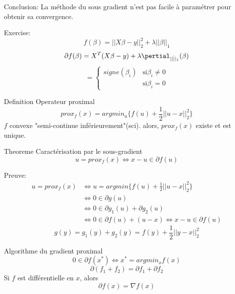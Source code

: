 \documentclass{article}
\begin{document}
Conclusion: La m\'ethode du sous gradient n'est pas facile \`a param\'etrer pour obtenir sa convergence.

Exercise: 
\begin{equation}
f(\beta)=||X\beta-y||_2^2+\lambda||\beta||_1
\end{equation}
\begin{equation}
\partial f(\beta)=X^T(X\beta-y)+\lambda\pertial_{||\dot||_1}(\beta)
\end{equation}
\begin{equation}
[\partial_{||\dot||_1}(\beta)]=\left\{\begin{array}{rcl}
signe(\beta_i) &\text{si} \beta_i\neq 0\\
[-1,1] & \text{si} \beta_i=0
\end{array}\right.
\end{equation}

Definition Operateur proximal
\begin{equation}
prox_f(x)=argmin_u \{f(u)+\frac{1}{2}||u-x||_2^2\}
\end{equation}
$f$ convexe "semi-continue inf\'erieurement"(sci). alors, $prox_f(x)$ existe et est unique.

Theoreme Caract\'erisation par le sous-gradient
\begin{equation}
u=prox_f(x) \Leftrightarrow x-u \in \partial f(u)
\end{equation}

Preuve:
\begin{equation}
\begin{split}
u=prox_f(x) &\Leftrightarrow u=argmin \{f(u)+\frac{1}{2}||u-x||_2^2\}\\
&\Leftrightarrow 0\in \partial g(u)\\
&\Leftrightarrow 0\in \partial g_1(u)+\partial g_2(u)\\
&\Leftrightarrow 0\in \partial f(u) + (u-x) \Leftrightarrow x-u \in\partial f(u)
\end{split}
\end{equation}
\begin{equation}
g(y)=g_1(y)+g_2(y)=f(y)+\frac{1}{2}||y-x||_2^2
\end{equation}

Algorithme du gradient proximal
\begin{equation}
0\in\partial f(x^*) \Leftrightarrow x^*=argmin_x f(x)
\end{equation}
\begin{equation}
\partial (f_1+f_2)=\partial f_1+\partial f_2
\end{equation}
Si $f$ est diff\'erentielle en $x$, alors
\begin{equation}
\partial f(x) =\nabla f(x)
\end{equation}
\end{document}
